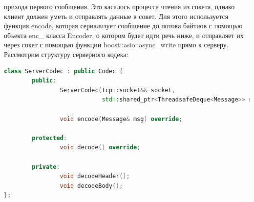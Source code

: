 \documentclass[a4paper, 14pt]{extreport}
\begin{document}
прихода первого сообщения. Это касалось процесса чтения из сокета, однако клиент должен уметь и отправлять данные в сокет. Для этого 
используется функция encode, которая сериализует сообщение до потока байтиов с помощью объекта enc\_ класса Encoder, о котором будет 
идти речь ниже, и отправляет их через сокет с помощью функции boost::asio::async\_write прямо к серверу. Рассмотрим структуру серверного 
кодека:
\begin{lstlisting}[language=C++, frame=single, xleftmargin=15pt, caption={Заголовочный файл класса ServerCodec},label=DescriptiveLabel]
class ServerCodec : public Codec {
        public:
                ServerCodec(tcp::socket&& socket,
                            std::shared_ptr<ThreadsafeDeque<Message>> storage);
        
                void encode(Message& msg) override;
        
        protected:
                void decode() override;
        
        private:
                void decodeHeader();
                void decodeBody();
};
\end{lstlisting}
\end{document}
